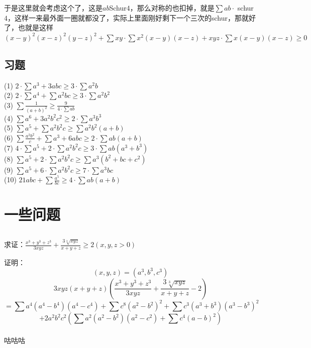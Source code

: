 \documentclass[UTF8]{ctexart}
\begin{document}
于是这里就会考虑这个了，这是$ab$Schur$4 $，那么对称的也扣掉，就是$ \displaystyle \sum ab·$ schur $4 $，这样一来最外面一圈就都没了，实际上里面刚好剩下一个三次的schur，那就好了，也就是这样
$ (x-y)^{2}(x-z)^{2}(y-z)^{2}+\displaystyle \sum x y \cdot \displaystyle \sum x^{2}(x-y)(x-z)+x y z \cdot \displaystyle \sum x(x-y)(x-z) \geq 0 $
\\
\subsection{习题}
\noindent (1) $2 \cdot \sum a^{3}+3 a b c \geq 3 \cdot \sum a^{2} b$\\
(2) $2 \cdot \sum a^{4}+\sum a^{2} b c \geq 3 \cdot \sum a^{2} b^{2}$\\
(3) $\sum \frac{1}{(a+b)^{2}} \geq \frac{9}{4 \cdot \sum a b}$\\
(4) $\sum a^{6}+3 a^{2} b^{2} c^{2} \geq 2 \cdot \sum a^{3} b^{3}$\\
(5) $\sum a^{5}+\sum a^{2} b^{2} c \geq \sum a^{2} b^{2}(a+b)$\\
(6) $\sum \frac{a^{2} b^{2}}{c}+\sum a^{3}+6 a b c \geq 2 \cdot \sum a b(a+b)$\\
(7) $4 \cdot \sum a^{5}+2 \cdot \sum a^{2} b^{2} c \geq 3 \cdot \sum a b\left(a^{3}+b^{3}\right)$\\
(8) $\sum a^{5}+2 \cdot \sum a^{2} b^{2} c \geq \sum a^{3}\left(b^{2}+b c+c^{2}\right)$\\
(9) $\sum a^{5}+6 \cdot \sum a^{2} b^{2} c \geq 7 \cdot \sum a^{3} b c$\\
(10) $21 a b c+\sum \frac{a^{5}}{b c} \geq 4 \cdot \sum a b(a+b)$\\
\section{一些问题}
\subsection{}

求证：$ \displaystyle \frac{x^{3}+y^{3}+z^{3}}{3 x y z}+\displaystyle \frac{3 \sqrt[3]{x y z}}{x+y+z} \geq 2(x, y, z>0) $

证明：
$$ (x, y, z)=\left(a^{3}, b^{3}, c^{3}\right) $$
$$3 x y z(x+y+z)\left(\displaystyle \frac{x^{3}+y^{3}+z^{3}}{3 x y z}+\displaystyle \frac{3 \sqrt[3]{x y z}}{x+y+z}-2\right) $$
$$ =\displaystyle \sum a^{4}\left(a^{4}-b^{4}\right)\left(a^{4}-c^{4}\right)+\displaystyle \sum c^{8}\left(a^{2}-b^{2}\right)^{2}+\displaystyle \sum c^{3}\left(a^{3}+b^{3}\right)\left(a^{3}-b^{3}\right)^{2} $$
$$ +2 a^{2} b^{2} c^{2}\left(\displaystyle \sum a^{2}\left(a^{2}-b^{2}\right)\left(a^{2}-c^{2}\right)+\displaystyle \sum c^{4}(a-b)^{2}\right) $$
\\
咕咕咕
\end{document}
